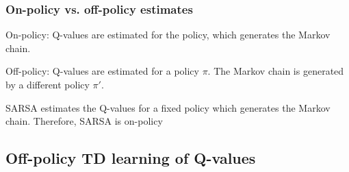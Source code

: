 \begin{frame} \frametitle{On-policy vs. off-policy estimates}
	\begin{block}{On-policy:}
		Q-values are estimated for the policy, which generates the Markov chain.
	\end{block}
	
	\vspace{5mm}
	
	\begin{block}{Off-policy:}
		Q-values are estimated for a policy $\pi$. The Markov chain is generated by a different policy $\pi'$.
	\end{block}
	
	
	SARSA estimates the Q-values for a fixed policy which generates the Markov chain. Therefore, SARSA is on-policy
\end{frame}

\subsection{Off-policy TD learning of Q-values}

